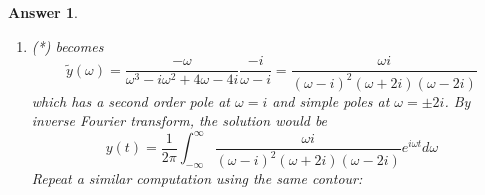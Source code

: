 \documentclass[a4paper]{article}
\newtheorem{ans}{Answer}[section]
\theoremstyle{new}
\begin{document}
\begin{ans}
\begin{enumerate}[label=(\alph*)]
\begin{center}
\begin{tikzpicture}
    \end{tikzpicture}
  \end{center}
  By residue theorem, we have
  $$\oint_{C:=C_R\cup C_0}\frac{-i}{\omega-i}e^{i\omega t}d\omega=2\pi i\frac{-ie^{-t}}{2\pi}=e^{-t}$$
  For $t<0$, we close the lower half-plane and again invoke Jordan's Lemma:
  $$\oint_{C':=C_R'\cup C_0}\frac{-i}{\omega-i}e^{i\omega t}d\omega=\int_{C_R'}\frac{-i}{\omega-i}e^{i\omega t}d\omega+\int_{-R}^R\frac{-i}{\omega-i}e^{i\omega t}d\omega\rightarrow 0+2\pi f(t<0)$$
  But no pole is enclosed so by residue theorem, $f(t<0)=0$. Similarly, for $t=0$, we just have
  $$f(t)=\frac{1}{2\pi}\int_{-\infty}^\infty-\frac{i}{\omega -i}d\omega=0$$
  Hence, the solution is
  $$f(t)=
\left\{
        \begin{array}{ll}
      e^{-t} & t>0 \\
      0 & t\leq0
        \end{array}
    \right.$$
\item (*) becomes
$$\tilde{y}(\omega)=\frac{-\omega}{\omega^3-i\omega^2+4\omega-4i}\frac{-i}{\omega-i}=\frac{\omega i}{(\omega-i)^2(\omega+2i)(\omega-2i)}$$
which has a second order pole at $\omega=i$ and simple poles at $\omega=\pm 2i$. By inverse Fourier transform, the solution would be
$$y(t)=\frac{1}{2\pi}\int_{-\infty}^\infty\frac{\omega i}{(\omega-i)^2(\omega+2i)(\omega-2i)}e^{i\omega t}d\omega$$
Repeat a similar computation using the same contour:
\begin{center}
\end{center}
\end{enumerate}
\end{ans}
\end{document}
